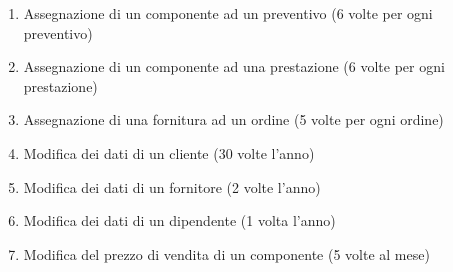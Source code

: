 \begin{enumerate}
			\item \label{op:ass_componente_preventivo}Assegnazione di un componente ad un preventivo (6 volte per ogni preventivo)
			\item \label{op:ass_componente_prestazione}Assegnazione di un componente ad una prestazione (6 volte per ogni prestazione)
			\item \label{op:ass_fornitura_ordine}Assegnazione di una fornitura ad un ordine (5 volte per ogni ordine)
			
			\item \label{op:edit_cliente}Modifica dei dati di un cliente (30 volte l’anno)
			\item \label{op:edit_fornitore}Modifica dei dati di un fornitore (2 volte l’anno)
			\item \label{op:edit_operatore}Modifica dei dati di un dipendente (1 volta l’anno)
			\item \label{op:edit_componente}Modifica del prezzo di vendita di un componente (5 volte al mese)
			

\end{enumerate}
